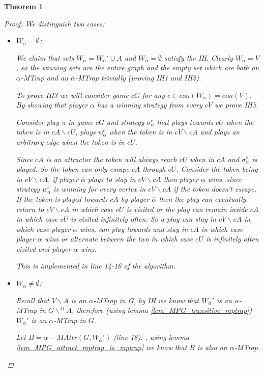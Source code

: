 \documentclass[]{article}
\newtheorem{theorem}{Theorem}[section]
\begin{document}
\begin{theorem}
\begin{proof}
		 We distinguish two cases:
		\begin{itemize}
			\item $W_{\overline{\alpha}} = \emptyset$:
			
			We claim that sets $W_\alpha = W_\alpha' \cup A$ and $W_{\overline{\alpha}} = \emptyset$ satisfy the IH. Clearly $W_\alpha = V$, so the winning sets are the entire graph and the empty set which are both an $\alpha$-MTrap and an $\overline{\alpha}$-MTrap trivially (proving IH1 and IH2).
			
			To prove IH3 we will consider game $cG$ for any $c \in con(W_\alpha) = con(V)$. By showing that player $\alpha$ has a winning strategy from every $cV$ we prove IH3.
			
			Consider play $\pi$ in game $cG$ and strategy $\sigma_\alpha^c$ that plays towards $cU$ when the token is in $cA \backslash cU$, plays $w^c_\alpha$ when the token is in $cV \backslash cA$ and plays an arbitrary edge when the token is in $cU$.
			
			Since $cA$ is an attractor the token will always reach $cU$ when in $cA$ and $\sigma_\alpha^c$ is played. So the token can only escape $cA$ through $cU$. Consider the token being in $cV\backslash cA$, if player $\overline{\alpha}$ plays to stay in $cV \backslash cA$ then player $\alpha$ wins, since strategy $w_\alpha^c$ is winning for every vertex in $cV \backslash cA$ if the token doesn't escape. If the token is played towards $cA$ by player $\overline{\alpha}$ then the play can eventually return to $cV \backslash cA$ in which case $cU$ is visited or the play can remain inside $cA$ in which case $cU$ is visited infinitely often. So a play can stay in $cV\backslash cA$ in which case player $\alpha$ wins, can play towards and stay in $cA$ in which case player $\alpha$ wins or alternate between the two in which case $cU$ is infinitely often visited and player $\alpha$ wins.
			
			This is implemented in line 14-16 of the algorithm.
			
			\item $W_{\overline{\alpha}} \neq \emptyset$:
			
			Recall that $V \backslash A$ is an $\alpha$-MTrap in G, by IH we know that $W_{\overline{\alpha}}'$ is an $\alpha$-MTrap in $G\backslash^{\!\!M} A$, therefore (using lemma \ref{lem_MPG_transitive_mptrap}) $W_{\overline{\alpha}}'$ is an $\alpha$-MTrap in $G$.
			
			Let $B = \overline{\alpha}{-}MAttr(G, W_{\overline{\alpha}}')$ (line 18). , using lemma \ref{lem_MPG_attract_mptrap_is_mptrap} we know that $B$ is also an $\alpha$-MTrap.
			

\end{itemize}
\end{proof}
\end{theorem}
\end{document}
